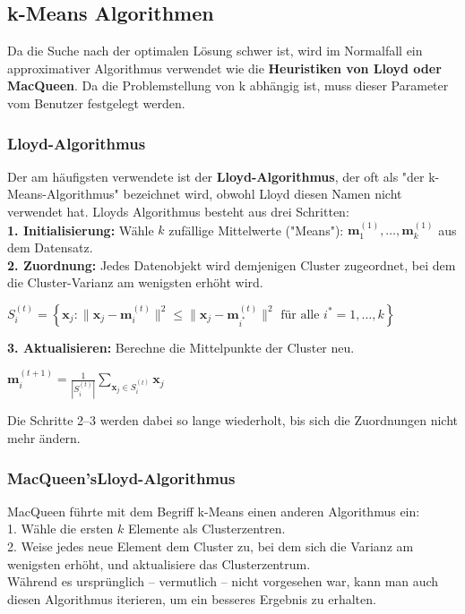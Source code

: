 \documentclass[12pt]{article}
\begin{document}
\subsection{k-Means Algorithmen}

Da die Suche nach der optimalen Lösung schwer ist, wird im Normalfall ein approximativer Algorithmus verwendet wie die \textbf{ Heuristiken von Lloyd oder MacQueen}. Da die Problemstellung von k abhängig ist, muss dieser Parameter vom Benutzer festgelegt werden.\\

\subsubsection{Lloyd-Algorithmus}

Der am häufigsten verwendete {\color{blue}{k-Means-Algorithmus}}  ist der \textbf{Lloyd-Algorithmus}, der oft als "der k-Means-Algorithmus" bezeichnet wird, obwohl Lloyd diesen Namen nicht verwendet hat. Lloyds Algorithmus besteht aus drei Schritten:\\[0.2cm]
\textbf{1. Initialisierung:} Wähle $k$ zufällige Mittelwerte ("Means"): $ \mathbf m_1^{(1)}, \ldots, \mathbf m_k^{(1)} $ aus dem Datensatz.\\
\textbf{2. Zuordnung:} Jedes Datenobjekt wird demjenigen Cluster zugeordnet, bei dem die Cluster-Varianz am wenigsten erhöht wird.
\begin{center}
$ S_i^{(t)} = \left\{ \mathbf x_j : \big\| \mathbf x_j - \mathbf m^{(t)}_i \big\|^2 \leq \big\| \mathbf x_j - \mathbf m^{(t)}_{i^*} \big\|^2 \text{ für alle }i^*=1,\ldots,k \right\}$\\[0.2cm]
\end{center}
\textbf{3. Aktualisieren:} Berechne die Mittelpunkte der Cluster neu.
\begin{center}
$ \mathbf m_i^{(t+1)} = \frac{1}{|S_i^{(t)}|} \sum_{\mathbf x_j \in S_{i}^{(t)}} \mathbf x_j  $ \\
\end{center}
Die Schritte 2–3 werden dabei so lange wiederholt, bis sich die Zuordnungen nicht mehr ändern.

\subsubsection{MacQueen'sLloyd-Algorithmus} 

MacQueen führte mit dem Begriff k-Means einen anderen Algorithmus ein:
\\[0.3cm]1. Wähle die ersten $k$ Elemente als Clusterzentren.\\
2. Weise jedes neue Element dem Cluster zu, bei dem sich die Varianz am wenigsten erhöht, und aktualisiere das Clusterzentrum.
\\[0.3cm]Während es ursprünglich – vermutlich – nicht vorgesehen war, kann man auch diesen Algorithmus iterieren, um ein besseres Ergebnis zu erhalten.
\end{document}
